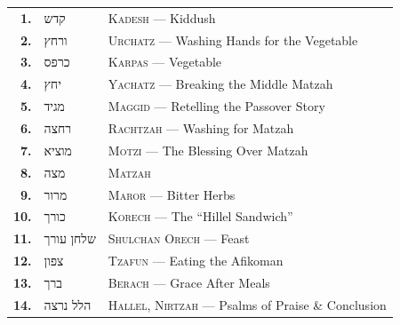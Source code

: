 \documentclass[11pt, openany]{book}
\providecommand{\texthebrew}[1]{{\hebrewfont\beginR #1\endR}}
\begin{document}
\begin{center}
\renewcommand{\arraystretch}{1.8}
\begin{tabular}{r@{\quad}l@{\qquad}l}
  \textcolor{sedergold}{\sffamily\bfseries 1.} &
    \texthebrew{קדש} &
    \textsc{Kadesh} --- Kiddush \\
  \textcolor{sedergold}{\sffamily\bfseries 2.} &
    \texthebrew{ורחץ} &
    \textsc{Urchatz} --- Washing Hands for the Vegetable \\
  \textcolor{sedergold}{\sffamily\bfseries 3.} &
    \texthebrew{כרפס} &
    \textsc{Karpas} --- Vegetable \\
  \textcolor{sedergold}{\sffamily\bfseries 4.} &
    \texthebrew{יחץ} &
    \textsc{Yachatz} --- Breaking the Middle Matzah \\
  \textcolor{sedergold}{\sffamily\bfseries 5.} &
    \texthebrew{מגיד} &
    \textsc{Maggid} --- Retelling the Passover Story \\
  \textcolor{sedergold}{\sffamily\bfseries 6.} &
    \texthebrew{רחצה} &
    \textsc{Rachtzah} --- Washing for Matzah \\
  \textcolor{sedergold}{\sffamily\bfseries 7.} &
    \texthebrew{מוציא} &
    \textsc{Motzi} --- The Blessing Over Matzah \\
  \textcolor{sedergold}{\sffamily\bfseries 8.} &
    \texthebrew{מצה} &
    \textsc{Matzah} \\
  \textcolor{sedergold}{\sffamily\bfseries 9.} &
    \texthebrew{מרור} &
    \textsc{Maror} --- Bitter Herbs \\
  \textcolor{sedergold}{\sffamily\bfseries 10.} &
    \texthebrew{כורך} &
    \textsc{Korech} --- The ``Hillel Sandwich'' \\
  \textcolor{sedergold}{\sffamily\bfseries 11.} &
    \texthebrew{שלחן עורך} &
    \textsc{Shulchan Orech} --- Feast \\
  \textcolor{sedergold}{\sffamily\bfseries 12.} &
    \texthebrew{צפון} &
    \textsc{Tzafun} --- Eating the Afikoman \\
  \textcolor{sedergold}{\sffamily\bfseries 13.} &
    \texthebrew{ברך} &
    \textsc{Berach} --- Grace After Meals \\
  \textcolor{sedergold}{\sffamily\bfseries 14.} &
    \texthebrew{הלל נרצה} &
    \textsc{Hallel, Nirtzah} --- Psalms of Praise \& Conclusion \\
\end{tabular}
\end{center}

\vspace{\fill}
\end{document}
